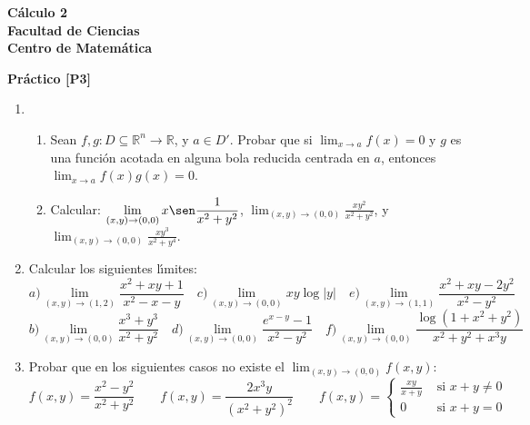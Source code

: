\documentclass[11pt]{article}
\newcommand{\R}{\mathbb{R}}
\begin{document}
 \hfill {\bf C\'{a}lculo 2} \\
{\bf Facultad de Ciencias}\\ 
{\bf Centro de Matem\'{a}tica} 

\vspace{1cm}

\begin{center}
{\bf Pr\'{a}ctico [P3] }
\end{center}

\vspace{0,1cm}

\begin{enumerate}

\item \begin{enumerate}


       \item Sean $f,g:D\subseteq\R^n\rightarrow\R$, y $a\in
         D'$. Probar que si $\lim_{x\rightarrow a}f(x)=0$ y $g$ es una 
         funci\'on acotada en alguna bola reducida centrada en $a$,
         entonces $\lim_{x\to a}f(x)g(x)=0$.  
       \item Calcular: $\displaystyle{\lim_{(x,y)\to (0,0)} x\sen
           \frac{1}{x^2 +y^2 }}$, 
         $\displaystyle{\lim_{(x,y)\to (0,0)}\frac{xy^{2}}{x^2
             +y^2}}$, y 
         $\displaystyle{\lim_{(x,y)\to (0,0)} %
         \frac{xy^{3}}{x^2 +y^4}}.$
      \end{enumerate}
       
\item\label{bonus4-1} Calcular los siguientes l\'\i mites:
      \[ a\textrm{)}\lim_{(x,y)\to (1,2)}\frac {x^2 +xy+1}{x^2 -x-y} \quad 
         c\textrm{)}\lim_{(x,y)\to (0,0)}xy\log|y| \quad
         e\textrm{)}\lim_{(x,y)\to (1,1)}\frac{x^2 +xy-2y^2 }{x^2-y^2}\] 
      \[ b\textrm{)}\lim_{(x,y)\to (0,0)}\frac{x^3 +y^3 }{x^2 +y^2} \quad 
         d\textrm{)}\lim_{(x,y)\to (0,0)}\frac{e^{x-y}-1 }{x^2 -y^2} \quad
         f\textrm{)}\lim_{(x,y)\to (0,0)}\frac{\log(1+x^2 +y^2) }{x^2 +y^2 +
           x^{3}y}\] 
\item Probar que en los siguientes casos no existe el
      $\lim_{(x,y)\rightarrow (0,0)} f(x,y)$: 
      \[ f(x,y)=\frac{x^2 -y^2}{x^2 +y^2} \qquad
      f(x,y)=\frac{2x^{3}y}{(x^{2}+y^{2})^{2}}  \qquad f(x,y)=\left\{  
      \begin{array}{ll} \frac{xy}{x+y} & \textrm{ si }x+y\neq 0 \\ 0
        &\textrm{ si }
        x+y=0  \end{array} \right. \]


\end{enumerate}
\end{document}
